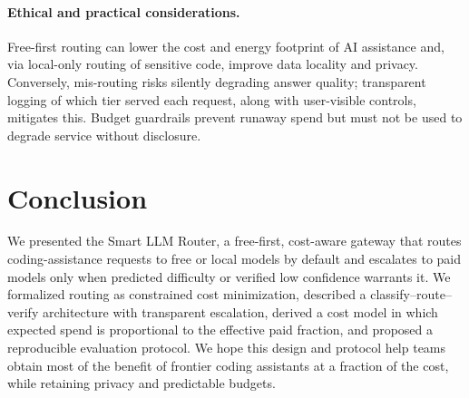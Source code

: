 \documentclass[11pt]{article}
\begin{document}
\paragraph{Ethical and practical considerations.}
Free-first routing can lower the cost and energy footprint of AI assistance and,
via local-only routing of sensitive code, improve data locality and privacy.
Conversely, mis-routing risks silently degrading answer quality; transparent
logging of which tier served each request, along with user-visible controls,
mitigates this. Budget guardrails prevent runaway spend but must not be used to
degrade service without disclosure.

\section{Conclusion}
\label{sec:conclusion}
We presented the Smart LLM Router, a free-first, cost-aware gateway that routes
coding-assistance requests to free or local models by default and escalates to
paid models only when predicted difficulty or verified low confidence warrants
it. We formalized routing as constrained cost minimization, described a
classify--route--verify architecture with transparent escalation, derived a
cost model in which expected spend is proportional to the effective paid
fraction, and proposed a reproducible evaluation protocol. We hope this design
and protocol help teams obtain most of the benefit of frontier coding
assistants at a fraction of the cost, while retaining privacy and predictable
budgets.
\end{document}
